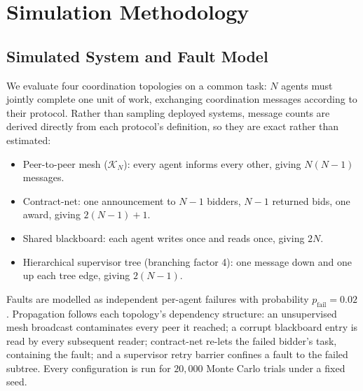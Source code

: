 \documentclass[10pt,journal,compsoc,twocolumn]{IEEEtran}
\begin{document}
\section{Simulation Methodology}



\subsection{Simulated System and Fault Model}


We evaluate four coordination topologies on a common task: $N$ agents must jointly complete one unit of work, exchanging coordination messages according to their protocol. Rather than sampling deployed systems, message counts are derived directly from each protocol's definition, so they are exact rather than estimated:

\begin{itemize}
  \item Peer-to-peer mesh ($\mathcal{K}_N$): every agent informs every other, giving $N(N-1)$ messages.
  \item Contract-net: one announcement to $N-1$ bidders, $N-1$ returned bids, one award, giving $2(N-1)+1$.
  \item Shared blackboard: each agent writes once and reads once, giving $2N$.
  \item Hierarchical supervisor tree (branching factor 4): one message down and one up each tree edge, giving $2(N-1)$.
\end{itemize}

Faults are modelled as independent per-agent failures with probability $p_{\text{fail}} = 0.02$. Propagation follows each topology's dependency structure: an unsupervised mesh broadcast contaminates every peer it reached; a corrupt blackboard entry is read by every subsequent reader; contract-net re-lets the failed bidder's task, containing the fault; and a supervisor retry barrier confines a fault to the failed subtree. Every configuration is run for $20{,}000$ Monte Carlo trials under a fixed seed.
\end{document}
